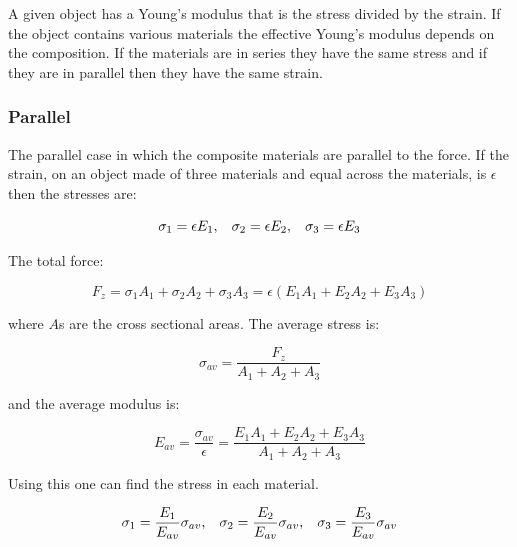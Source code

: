 \documentclass[hidelinks]{article}
\numberwithin{equation}{section}
\begin{document}
    A given object has a Young's modulus that is the stress divided by the strain. If 
    the object contains various materials the effective Young's modulus depends on the 
    composition. If the materials are in series they have the same stress and if they 
    are in parallel then they have the same strain.

    \subsubsection{Parallel}

    The parallel case in which the composite materials are parallel to the force. If the 
    strain, on an object made of three materials and equal across the materials, is 
    $\epsilon$ then the stresses are:

    \begin{equation}\label{eq: parallel-youngs-mod-stresses}
        \sigma_1 = \epsilon E_1, \hspace{0.3cm} \sigma_2 = \epsilon E_2,\hspace{0.3cm} 
        \sigma_3 = \epsilon E_3
    \end{equation}

    \noi The total force:

    \begin{equation}\label{eq: parallel-youngs-mod-tot-force}
        F_z = \sigma_1A_1 + \sigma_2A_2 + \sigma_3A_3 = \epsilon(E_1A_1 + E_2A_2 + E_3A_3)
    \end{equation}

    \noi where $A$s are the cross sectional areas. The average stress is:

    \begin{equation}\label{eq: parallel-youngs-mod-av-stress}
    \sigma_{av} = \frac{F_z}{A_1 + A_2 + A_3}
    \end{equation}

    \noi and the average modulus is:

    \begin{equation}\label{eq: parallel-youngs-mod-av-mod}
        E_{av} = \frac{\sigma_{av}}{\epsilon} = \frac{E_1A_1 + 
        E_2A_2 + E_3A_3}{A_1 + A_2 + A_3}
    \end{equation}

    \noindent Using this one can find the stress in each material.

    \begin{equation}\label{eq: parallel-youngs-mod-individual-stresses}
        \sigma_1 = \frac{E_1}{E_{av}}\sigma_{av}, \hspace{0.3cm} 
        \sigma_2 = \frac{E_2}{E_{av}}\sigma_{av}, \hspace{0.3cm} 
        \sigma_3 = \frac{E_3}{E_{av}}\sigma_{av} 
    \end{equation}
\end{document}
